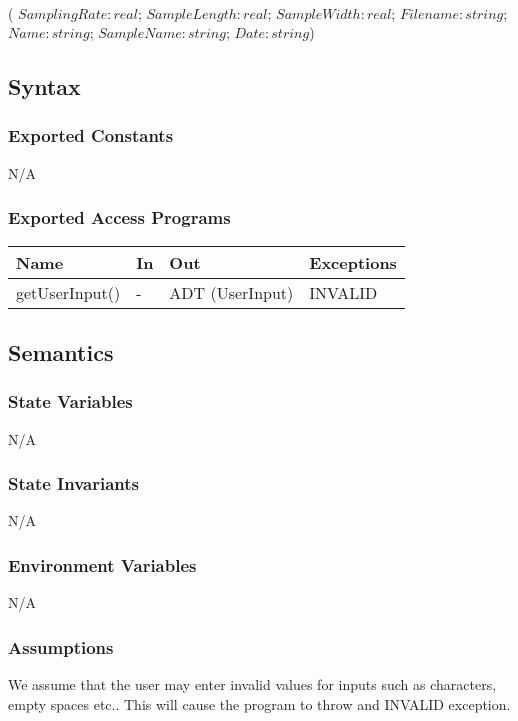 \documentclass[12pt, titlepage]{article}
\begin{document}
 \\
( $SamplingRate: real$; $SampleLength: real$; $SampleWidth: real$; $Filename: string$; $Name: string$; $SampleName: string$; $Date: string$)

\subsection{Syntax}

\subsubsection{Exported Constants}
N/A

\subsubsection{Exported Access Programs}

\begin{center}
\begin{tabular}{p{4cm} p{2cm} p{6cm} p{2cm}}
\hline
\textbf{Name} & \textbf{In} & \textbf{Out} & \textbf{Exceptions} \\
\hline
getUserInput() & - & ADT (UserInput) & INVALID \\
\hline
\end{tabular}
\end{center}

\subsection{Semantics}

\subsubsection{State Variables}
N/A

\subsubsection{State Invariants}
N/A

\subsubsection{Environment Variables}

N/A

\subsubsection{Assumptions}
We assume that the user may enter invalid values for inputs such as characters, empty spaces etc..
This will cause the program to throw and INVALID exception.
\end{document}

